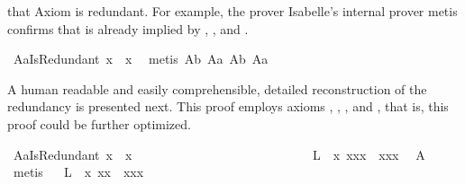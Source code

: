 \begin{isabellebody}
\begin{isamarkuptext}
that Axiom  is redundant. For example, the prover Isabelle's internal prover metis 
confirms that  is already implied by , ,  
and .%
\end{isamarkuptext}%
\isamarkuptrue%
\isamarkupfalse%
\ A{}aIsRedundant{\isacharunderscore}{}{\isacharcolon}\ {\isachardoublequoteopen}{\isacharparenleft}{\isasymbox}x{\isacharparenright}{\isasymbox}\ {\isasymapprox}\ {\isasymbox}x{\isachardoublequoteclose}\ \isanewline
%
\isadelimproof
%
\endisadelimproof
%
\isatagproof
{}\isamarkupfalse%
\ {\isacharparenleft}metis\ A{}b\ A{}a\ A{}b\ A{}a{\isacharparenright}%
\endisatagproof
{\isafoldproof}%
%
\isadelimproof
%
\endisadelimproof
%
\begin{isamarkuptext}%
A human readable and easily comprehensible, detailed reconstruction of the redundancy is 
presented next. This proof employs axioms , , , 
 and , that is, this proof could be further optimized.%
\end{isamarkuptext}%
\isamarkuptrue%
\isamarkupfalse%
\ A{}aIsRedundant{\isacharunderscore}{}{\isacharcolon}\ {\isachardoublequoteopen}{\isacharparenleft}{\isasymbox}x{\isacharparenright}{\isasymbox}\ {\isasymapprox}\ {\isasymbox}x{\isachardoublequoteclose}\ \isanewline
%
\isadelimproof
\ %
\endisadelimproof
%
\isatagproof
{}\isamarkupfalse%
\ {\isacharminus}\ \ \ \ \ \ \ \ \ \ \ \ \ \ \ \ \ \ \ \ \isanewline
\ \isamarkupfalse%
\ \ L{}{\isacharcolon}\ \ {\isachardoublequoteopen}{\isasymforall}x{\isachardot}\ {\isacharparenleft}{\isasymbox}{\isasymbox}x{\isacharparenright}{\isasymcdot}{\isacharparenleft}{\isacharparenleft}{\isasymbox}x{\isacharparenright}{\isasymcdot}x{\isacharparenright}\ {\isasymapprox}\ {\isacharparenleft}{\isacharparenleft}{\isasymbox}{\isasymbox}x{\isacharparenright}{\isasymcdot}{\isacharparenleft}{\isasymbox}x{\isacharparenright}{\isacharparenright}{\isasymcdot}x{\isachardoublequoteclose}\ \isamarkupfalse%
\ A{}\ \isamarkupfalse%
\ metis\isanewline
\ \isamarkupfalse%
\ L{}{\isacharcolon}\ \ {\isachardoublequoteopen}{\isasymforall}x{\isachardot}\ {\isacharparenleft}{\isasymbox}{\isasymbox}x{\isacharparenright}{\isasymcdot}x\ {\isasymapprox}\ {\isacharparenleft}{\isacharparenleft}{\isasymbox}{\isasymbox}x{\isacharparenright}{\isasymcdot}{\isacharparenleft}{\isasymbox}x{\isacharparenright}{\isacharparenright}{\isasymcdot}x{\isachardoublequoteclose}\ \ \ \ \ \ \ \ \isamarkupfalse%

\end{isabellebody}
